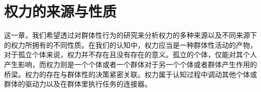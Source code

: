 \documentclass[main.tex]{subfiles}
\begin{document}
\chapter{权力的来源与性质}
这一章，我们希望透过对群体性行为的研究来分析权力的多种来源以及不同来源下的权力所拥有的不同性质。在我们的认知中，权力应当是一种群体性活动的产物，对于孤立个体来说，权力并不存在且没有存在的意义。孤立的个体，仅能对其个人产生影响，而权力则是一个个体或者一个群体对于另一个个体或者群体产生作用的桥梁。权力的存在与群体性的决策紧密关联。权力属于认知过程中调动其他个体或群体的驱动力以及在群体里执行任务的连接器。







\end{document}
